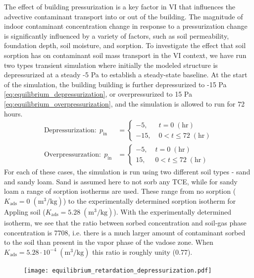 The effect of building pressurization is a key factor in VI that influences the advective contaminant transport into or out of the building.
The magnitude of indoor contaminant concentration change in response to a pressurization change is significantly influenced by a variety of factors, such as soil permeability, foundation depth, soil moisture, and sorption.
To investigate the effect that soil sorption has on contaminant soil mass transport in the VI context, we have run two types transient simulation where initially the modeled structure is depressurized at a steady -5 Pa to establish a steady-state baseline.
At the start of the simulation, the building building is further depressurized to -15 Pa \eqref{eq:equilibrium_depressurization}, or overpressurized to 15 Pa \eqref{eq:equilibrium_overpressurization}, and the simulation is allowed to run for 72 hours. %
\begin{align}
  \text{Depressurization}: \; p_\mathrm{in} &= \begin{cases}
    -5, \; &t = 0 \; \mathrm{(hr)} \\
    -15, \; &0 < t \leq 72 \; \mathrm{(hr)}
\end{cases}\label{eq:equilibrium_depressurization}\\
\text{Overpressurzation}: \; p_\mathrm{in} &= \begin{cases}
  -5, \; &t = 0 \; \mathrm{(hr)} \\
  15, \; &0 < t \leq 72 \; \mathrm{(hr)}
\end{cases}\label{eq:equilibrium_overpressurization}
\end{align}
For each of these cases, the simulation is run using two different soil types - sand and sandy loam.
Sand is assumed here to not sorb any TCE, while for sandy loam a range of sorption isotherms are used.
These range from no sorption ($K_\mathrm{ads} = 0 \; \mathrm{(m^3/kg)}$) to the experimentally determined sorption isotherm for Appling soil ($K_\mathrm{ads} = 5.28 \; \mathrm{(m^3/kg)}$).
With the experimentally determined isotherm, we see that the ratio between sorbed concentration and soil-gas phase concentration is 7708, i.e. there is a much larger amount of contaminant sorbed to the soil than present in the vapor phase of the vadose zone.
When $K_\mathrm{ads} = 5.28 \cdot 10^{-4} \; \mathrm{(m^3/kg)}$ this ratio is roughly unity (0.77).\par

\begin{figure}[!htb]
  \texttt{[image: equilibrium\_retardation\_depressurization.pdf]}
  \caption{}
  \label{fig:equilibrium_depressurization}
\end{figure}


